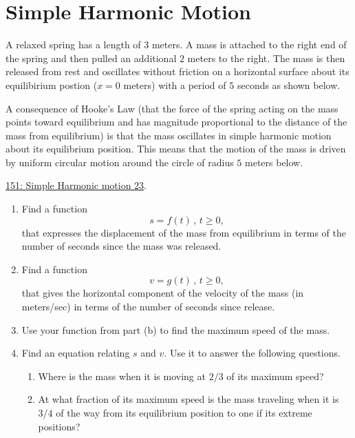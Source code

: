 \documentclass{ximera}
\begin{document}
\section{Simple Harmonic Motion}

\begin{question} \label{QODFIER33r3r}
A relaxed spring has a length of $3$ meters. A mass is attached to the right end of the spring and then pulled an additional $2$ meters to the right. The mass is then released from rest and oscillates without friction on a horizontal surface about its equilibirium postion ($x=0$ meters) with a period of $5$ seconds as shown below. 

A consequence of Hooke's Law (that the force of the spring acting on the mass points toward equilibrium and has magnitude proportional to the distance of the mass from equilibrium) is that the mass oscillates in simple harmonic motion about its equilibrium position.  This means that the motion of the mass is driven by uniform circular motion around the circle of radius $5$ meters below.

\href{https://www.desmos.com/calculator/noxooak1au}{151: Simple Harmonic motion 23}.

 
\begin{onlineOnly}
    \begin{center}
\end{center}
\end{onlineOnly}


\begin{enumerate}

\item Find a function
\[
     s = f(t) \, , \, t\geq 0, 
\]
that expresses the displacement of the mass from equilibrium in terms of the number of seconds since the mass was released.

\item Find a function 
\[
 v = g(t) \, , \, t\geq 0, 
\]
that gives the horizontal component of the velocity of the mass (in meters/sec) in terms of the number of seconds since release.

\item Use your function from part (b) to find the maximum speed of the mass.

\item Find an equation relating $s$ and $v$. Use it to answer the following questions.

\begin{enumerate}
\item Where is the mass when it is moving at $2/3$ of its maximum speed? 

\item At what fraction of its maximum speed is the mass traveling when it is $3/4$ of the way from its equilibrium position to one if its extreme positions?
\end{enumerate}

\end{enumerate}

\end{question}
\end{document}
